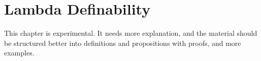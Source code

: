 \documentclass[../../../include/open-logic-chapter]{subfiles}
\begin{document}
\chapter{Lambda Definability}

\begin{editorial}
  This chapter is experimental. It needs more explanation, and the
  material should be structured better into definitions and
  propositions with proofs, and more examples.
\end{editorial}


\OLEndChapterHook
\end{document}
